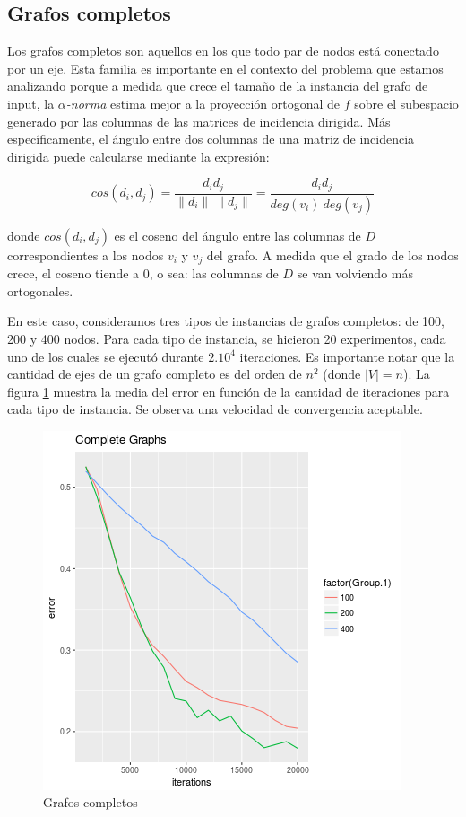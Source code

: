 \documentclass[conference,compsoc,a4paper]{IEEEtran}
\begin{document}
\subsection{Grafos completos}

Los grafos completos son aquellos en los que todo par de nodos está 
conectado por un eje. Esta familia es importante en el contexto del 
problema que estamos analizando porque a medida que crece el tamaño de 
la instancia del grafo de input, la \emph{$\alpha$-norma} estima mejor a 
la proyección ortogonal de $f$ sobre el subespacio generado por las 
columnas de las matrices de incidencia dirigida. Más específicamente, 
el ángulo entre dos columnas de una matriz de incidencia dirigida puede 
calcularse mediante la expresión:

$$cos(d_i,d_j) = \frac{d_i d_j}{\|d_i\| \ \|d_j\|} = 
\frac{d_i d_j}{deg(v_i) \ deg(v_j)}$$

\noindent donde $cos(d_i,d_j)$ es el coseno del ángulo entre las columnas de $D$ 
correspondientes a los nodos $v_i$ y $v_j$ del grafo. A medida que el 
grado de los nodos crece, el coseno tiende a $0$, o sea: las columnas 
de $D$ se van volviendo más ortogonales.

\smallskip

En este caso, consideramos tres tipos de instancias de grafos 
completos: de 100, 200 y 400 nodos. Para cada tipo de instancia, se 
hicieron 20 experimentos, cada uno de los cuales se ejecutó durante 
$2 . 10^4$ iteraciones. Es importante notar que la cantidad de ejes de 
un grafo completo es del orden de $n^2$ (donde $|V| = n$).  La figura 
\ref{fig:complete} muestra la media del error en función de la cantidad 
de iteraciones para cada tipo de instancia. Se observa una velocidad de 
convergencia aceptable.


\begin{figure}
	\includegraphics[width=\linewidth]{complete_graphs.png} %
	\caption{Grafos completos} %
	\label{fig:complete} %
\end{figure}
\end{document}
